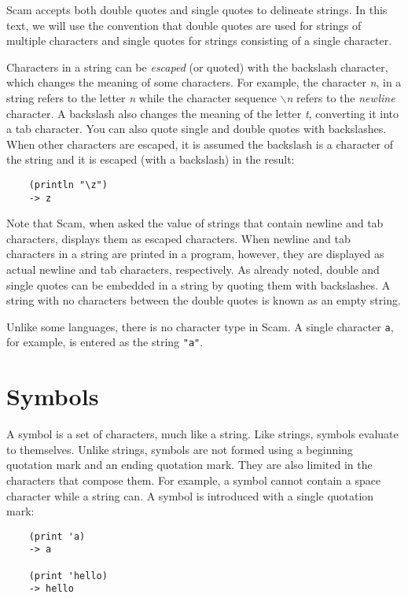 Scam accepts both double quotes and single quotes to
delineate strings. In this text, we will use the convention
that double quotes are used for strings of multiple 
characters and single quotes for strings consisting of
a single character.

Characters in a string can be {\it escaped} (or quoted)
with the backslash character,
which changes the meaning of some characters. For example, the character
{\it n}, in a string refers to the letter {\it n} while the character sequence
{\it $\backslash$n}
refers
to the {\it newline} character. A backslash also changes the meaning of the
letter {\it t},
converting it into a tab character.
You can also quote single and double quotes with backslashes.
When other characters are escaped,
it is assumed the backslash is a character of the
string and it is escaped (with a backslash) in the result:

\begin{verbatim}
    (println "\z")
    -> z
\end{verbatim}

Note that Scam, when asked
the value of strings that contain newline and tab characters, displays
them as escaped characters. When newline and tab characters in a string
are printed in a program, however, they are displayed as actual newline
and tab characters, respectively.
As already noted,
double and single quotes can be embedded in a
string by quoting them with backslashes. A string with no characters
between the double quotes is known as an empty string.

Unlike some languages, there is no character type in Scam. A single
character {\verb+a+}, for example, is entered as the string
{\verb+"a"+}.

\section{Symbols}

A symbol is a set of characters, much like a string. Like strings,
symbols evaluate to themselves. Unlike strings,
symbols are not formed using a beginning quotation mark and an
ending quotation mark. They are also limited
in the characters that compose them. For example, a symbol cannot
contain a space character while a string can. A symbol is introduced
with a single quotation mark:

\begin{verbatim}
    (print 'a)
    -> a

    (print 'hello)
    -> hello
\end{verbatim}

